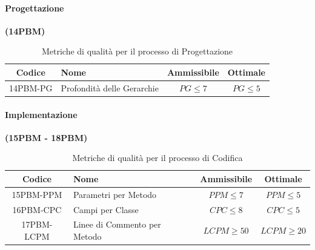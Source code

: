 \documentclass{article}
\begin{document}
\paragraph{Progettazione}%
\textbf{(14PBM)}
\begin{table}[H]
    \centering
    \renewcommand{\arraystretch}{1.5} %
    \begin{tabular}{|c|l|c|c|}
        \hline
        \textbf{Codice} & \textbf{Nome} & \textbf{Ammissibile} & \textbf{Ottimale} \\
        \hline
        14PBM-PG & Profondità delle Gerarchie & $PG \leq 7$ & $PG \leq 5$ \\
        \hline
    \end{tabular}
    \label{tab:progettazione}
    \caption{Metriche di qualità per il processo di Progettazione}
\end{table}
\newpage
\paragraph{Implementazione}%
\textbf{(15PBM - 18PBM)}
\begin{table}[H]
    \centering
    \renewcommand{\arraystretch}{1.5} %
    \begin{tabular}{|c|l|c|c|}
        \hline
        \textbf{Codice} & \textbf{Nome} & \textbf{Ammissibile} & \textbf{Ottimale} \\
        \hline
        15PBM-PPM & Parametri per Metodo & $PPM \leq 7$ & $PPM \leq 5$\\
        16PBM-CPC & Campi per Classe & $CPC \leq 8$ & $CPC \leq 5$ \\
        17PBM-LCPM & Linee di Commento per Metodo & $LCPM \geq 50$ & $LCPM \geq 20$ \\
        \hline
    \end{tabular}
    \label{tab:codifica}
    \caption{Metriche di qualità per il processo di Codifica}
\end{table}
\end{document}
